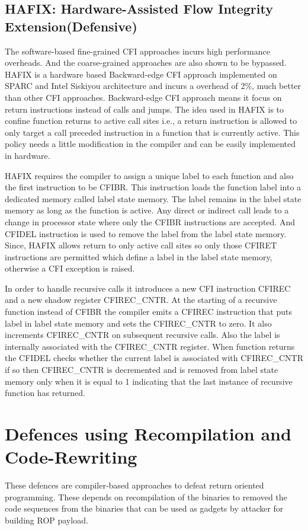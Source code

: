 \documentclass{article}
\begin{document}
\begin{multicols}{2}
	\subsection{HAFIX: Hardware-Assisted Flow Integrity Extension(Defensive)}
	The software-based fine-grained CFI approaches incurs high performance overheads. And the coarse-grained approaches are also shown to be bypassed. HAFIX is a hardware based Backward-edge CFI approach implemented on SPARC and Intel Siskiyou architecture and incurs a overhead of 2\%, much better than other CFI approaches. Backward-edge CFI approach means it focus on return instructions instead of calls and jumps. The idea used in HAFIX is to confine function returns to active call sites i.e., a return instruction is allowed to only target a call preceded instruction in a function that is currently active. This policy needs a little modification in the compiler and can be easily implemented in hardware.
	
	HAFIX requires the compiler to assign a unique label to each function and also the first instruction to be CFIBR. This instruction loads the function label into a dedicated memory called label state memory. The label remains in the label state memory as long as the function is active. Any direct or indirect call leads to a change in processor state where only the CFIBR instructions are accepted. And CFIDEL instruction is used to remove the label from the label state memory. Since, HAFIX allows return to only active call sites so only those CFIRET instructions are permitted which define a label in the label state memory, otherwise a CFI exception is raised.
	
	In order to handle recursive calls it introduces a new CFI instruction CFIREC and a new shadow register CFIREC\_CNTR. At the starting of a recursive function instead of CFIBR the compiler emits a CFIREC instruction that puts label in label state memory and sets the CFIREC\_CNTR to zero. It also increments CFIREC\_CNTR on subsequent recursive calls. Also the label is internally associated with the CFIREC\_CNTR register. When function returns the CFIDEL checks whether the current label is associated with CFIREC\_CNTR if so then CFIREC\_CNTR is decremented and is removed from label state memory only when it is equal to 1 indicating that the last instance of recursive function has returned.
	
	\section{Defences using Recompilation and Code-Rewriting}
	These defences are compiler-based approaches to defeat return oriented programming. These depends on recompilation of the binaries to removed the code sequences from the binaries that can be used as gadgets by attacker for building ROP payload.
	

\end{multicols}
\end{document}
